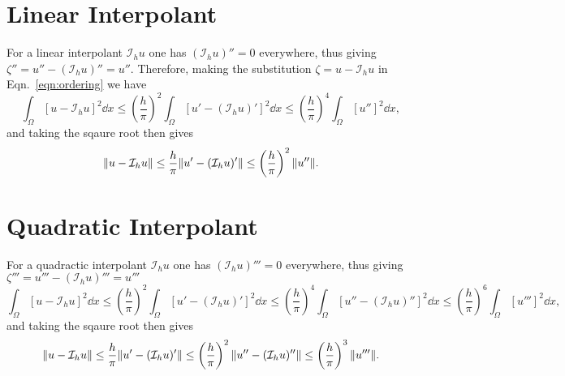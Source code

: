\documentclass{article}
\newcommand*{\interp}[1]{\mathcal{I}_h #1}
\begin{document}
\section{Linear Interpolant}

\noindent
For a linear interpolant $\interp{u}$ one has $(\interp{u})''=0$ everywhere, thus giving $\zeta''=u''-(\interp{u})''=u''$. Therefore, making the substitution $\zeta=u-\interp{u}$ in Eqn.~\ref{eqn:ordering} we have
\begin{equation}
\int_{\Omega}[u-\interp{u}]^2\dd{x}\leq\left(\frac{h}{\pi}\right)^2\int_{\Omega}[u'-(\interp{u})']^2\dd{x}\leq\left(\frac{h}{\pi}\right)^4\int_{\Omega}[u'']^2\dd{x},
\end{equation}
and taking the sqaure root then gives
\begin{equation}
\norm{u-\interp{u}}\leq\frac{h}{\pi}\norm{u'-(\interp{u})'}\leq\left(\frac{h}{\pi}\right)^2\norm{u''}.
\end{equation}


\section{Quadratic Interpolant}

\noindent
For a quadractic interpolant $\interp{u}$ one has $(\interp{u})'''=0$ everywhere, thus giving $\zeta'''=u'''-(\interp{u})'''=u'''$
\begin{equation}
\int_{\Omega}[u-\interp{u}]^2\dd{x}\leq\left(\frac{h}{\pi}\right)^2\int_{\Omega}[u'-(\interp{u})']^2\dd{x}\leq\left(\frac{h}{\pi}\right)^4\int_{\Omega}[u''-(\interp{u})'']^2\dd{x}\leq\left(\frac{h}{\pi}\right)^6\int_{\Omega}[u''']^2\dd{x},
\end{equation}
and taking the sqaure root then gives
\begin{equation}
\norm{u-\interp{u}}\leq\frac{h}{\pi}\norm{u'-(\interp{u})'}\leq\left(\frac{h}{\pi}\right)^2\norm{u''-(\interp{u})''}\leq\left(\frac{h}{\pi}\right)^3\norm{u'''}.
\end{equation}

\end{document}
